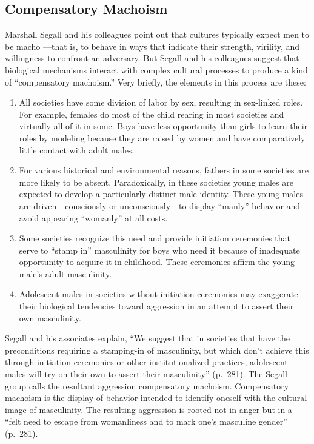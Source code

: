 \documentclass[
]{book}
\providecommand{\tightlist}{%
  \setlength{\itemsep}{0pt}\setlength{\parskip}{0pt}}
\begin{document}
\hypertarget{compensatory-machoism}{%
\subsection*{Compensatory Machoism}\label{compensatory-machoism}}

Marshall Segall and his colleagues point out that cultures typically expect men to be macho ---that is, to behave in ways that indicate their strength, virility, and willingness to confront an adversary. But Segall and his colleagues suggest that biological mechanisms interact with complex cultural processes to produce a kind of ``compensatory machoism.'' Very briefly, the elements in this process are these:

\begin{enumerate}
\def\labelenumi{\arabic{enumi}.}
\tightlist
\item
  All societies have some division of labor by sex, resulting in sex-linked roles. For example, females do most of the child rearing in most societies and virtually all of it in some. Boys have less opportunity than girls to learn their roles by modeling because they are raised by women and have comparatively little contact with adult males.\\
\item
  For various historical and environmental reasons, fathers in some societies are more likely to be absent. Paradoxically, in these societies young males are expected to develop a particularly distinct male identity. These young males are driven---consciously or unconsciously---to display ``manly'' behavior and avoid appearing ``womanly'' at all costs.\\
\item
  Some societies recognize this need and provide initiation ceremonies that serve to ``stamp in'' masculinity for boys who need it because of inadequate opportunity to acquire it in childhood. These ceremonies affirm the young male's adult masculinity.\\
\item
  Adolescent males in societies without initiation ceremonies may exaggerate their biological tendencies toward aggression in an attempt to assert their own masculinity.
\end{enumerate}

Segall and his associates explain, ``We suggest that in societies that have the preconditions requiring a stamping-in of masculinity, but which don't achieve this through initiation ceremonies or other institutionalized practices, adolescent males will try on their own to assert their masculinity'' (p.~281). The Segall group calls the resultant aggression compensatory machoism. Compensatory machoism is the display of behavior intended to identify oneself with the cultural image of masculinity. The resulting aggression is rooted not in anger but in a ``felt need to escape from womanliness and to mark one's masculine gender'' (p.~281).
\end{document}

